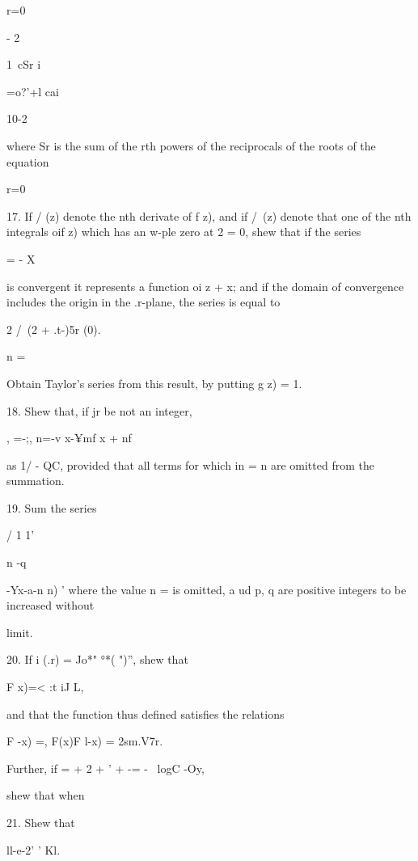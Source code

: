 {{r=0

- 2

1\ cSr i

=o?'+l cai

10-2

%
%

where Sr is the sum of the rth powers of the reciprocals of the roots
of the equation

r=0


17. If / (z) denote the nth derivate of f z), and if /\ (z) denote
that one of the nth integrals oif z) which has an w-ple zero at 2 = 0,
shew that if the series

  = - X

is convergent it represents a function oi z + x; and if the domain of
convergence includes the origin in the .r-plane, the series is equal
to


2 /\ (2 + .t-)5r (0).

n =

Obtain Taylor's series from this result, by putting g z) = 1.

18. Shew that, if jr be not an integer,

, =-;, n=-v x-¥mf x + nf

as 1/ - QC, provided that all terms for which in = n are omitted from
the summation.


19. Sum the series

  / 1 1'

n -q \ \ {-Yx-a-n n) ' where the value n = is omitted, a ud p, q are
positive integers to be increased without

limit.


20. If i (.r) = Jo*" °*( ")'', shew that

F x)=< :t iJ L,

and that the function thus defined satisfies the relations

F -x) =, F(x)F l-x) = 2sm.V7r.

Further, if = + 2 + ' + -= - \ logC -Oy,

shew that when

21. Shew that

ll-e-2' ' Kl.


}}}
